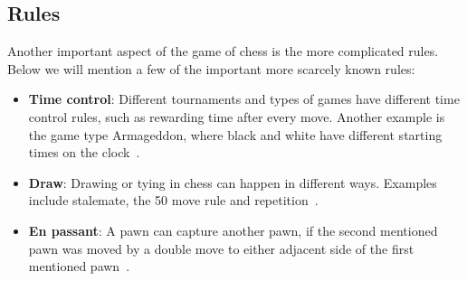 
\subsection{Rules}\label{subsec:rules}

Another important aspect of the game of chess is the more complicated rules.
Below we will mention a few of the important more scarcely known rules:

\begin{itemize}
    \item \textbf{Time control}: Different tournaments and types of games have different time control rules, such as
    rewarding time after every move.
    Another example is the game type Armageddon, where black and white have different starting times on the clock~\cite{schiller2012}.
    \item \textbf{Draw}: Drawing or tying in chess can happen in different ways.
    Examples include stalemate, the 50 move rule and repetition~\cite{schiller2012}.
    \item \textbf{En passant}: A pawn can capture another pawn, if the second mentioned pawn was moved by a double move
    to either adjacent side of the first mentioned pawn~\cite{schiller2012}.
\end{itemize}
